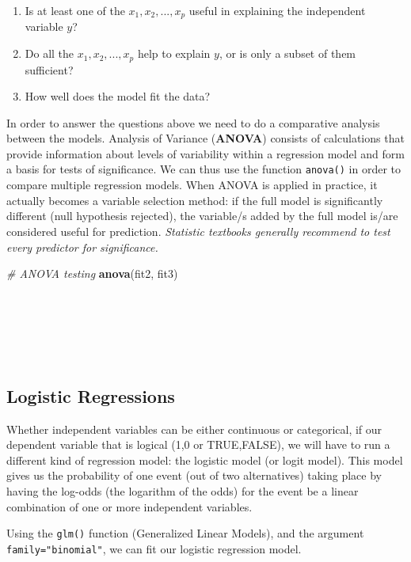 \documentclass[
]{article}
\newenvironment{Shaded}{\begin{snugshade}}{\end{snugshade}}
\newcommand{\CommentTok}[1]{\textcolor[rgb]{0.56,0.35,0.01}{\textit{#1}}}
\newcommand{\FunctionTok}[1]{\textcolor[rgb]{0.13,0.29,0.53}{\textbf{#1}}}
\newcommand{\NormalTok}[1]{#1}
\begin{document}
\begin{enumerate}
\def\labelenumi{\arabic{enumi}.}
\item
  Is at least one of the \(x_1, x_2, . . . ,x_p\) useful in explaining
  the independent variable \(y\)?
\item
  Do all the \(x_1, x_2, . . . ,x_p\) help to explain \(y\), or is only a
  subset of them sufficient?
\item
  How well does the model fit the data?
\end{enumerate}

In order to answer the questions above we need to do a comparative
analysis between the models. Analysis of Variance (\textbf{ANOVA}) consists
of calculations that provide information about levels of variability
within a regression model and form a basis for tests of significance. We
can thus use the function \texttt{anova()} in order to compare multiple
regression models. When ANOVA is applied in practice, it actually
becomes a variable selection method: if the full model is significantly
different (null hypothesis rejected), the variable/s added by the full
model is/are considered useful for prediction. \emph{Statistic textbooks
generally recommend to test every predictor for significance.}

\begin{Shaded}
\begin{Highlighting}[]
\CommentTok{\# ANOVA testing}
\FunctionTok{anova}\NormalTok{(fit2, fit3)}
\end{Highlighting}
\end{Shaded}

~

~

~

\hypertarget{logistic-regressions}{%
\subsection{Logistic Regressions}\label{logistic-regressions}}

Whether independent variables can be either continuous or categorical,
if our dependent variable that is logical (1,0 or TRUE,FALSE), we will
have to run a different kind of regression model: the logistic model (or
logit model). This model gives us the probability of one event (out of
two alternatives) taking place by having the log-odds (the logarithm of
the odds) for the event be a linear combination of one or more
independent variables.

Using the \texttt{glm()} function (Generalized Linear Models), and the argument
\texttt{family="binomial"}, we can fit our logistic regression model.
\end{document}
